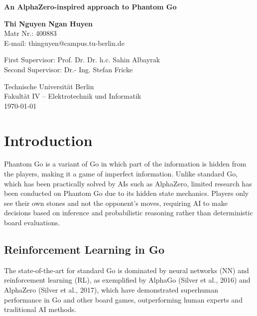 \documentclass[12pt,oneside,openright]{article}
\newcommand{\topic}
{An AlphaZero-inspired approach to Phantom Go}
\begin{document}
\date{\today}
\begin{center}
  \vspace*{1cm}
  \Huge
  \textbf{\topic}
  \LARGE

  \vspace{2cm}

  \textbf{Thi Nguyen Ngan Huyen}\\
  \vspace{0.5cm}
  \normalsize
  Matr Nr.: 400883\\
  E-mail: thinguyen@campus.tu-berlin.de
  \vspace{2cm}

  \large
  \begin{center}
    First Supervisor: Prof. Dr. Dr. h.c. Sahin Albayrak \\
    Second Supervisor: Dr.- Ing. Stefan Fricke
  \end{center}        \vspace{0.8cm}

  \Large
  Technische Universität Berlin\\
  Fakultät IV – Elektrotechnik und Informatik\\
  \vspace{1cm}
  \today
\end{center}
\newpage

\section{Introduction}

Phantom Go is a variant of Go in which part of the information is hidden from the players, making it a game of imperfect information. Unlike standard Go, which has been practically solved by AIs such as AlphaZero, limited research has been conducted on Phantom Go due to its hidden state mechanics. Players only see their own stones and not the opponent’s moves, requiring AI to make decisions based on inference and probabilistic reasoning rather than deterministic board evaluations.

\subsection{Reinforcement Learning in Go}

The state-of-the-art for standard Go is dominated by neural networks (NN) and reinforcement learning (RL), as exemplified by AlphaGo (Silver et al., 2016)\cite{Silver2016} and AlphaZero (Silver et al., 2017)\cite{Silver2017}, which have demonstrated superhuman performance in Go and other board games, outperforming human experts and traditional AI methods.
\end{document}
